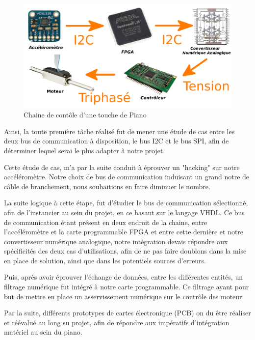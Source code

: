 \documentclass[french,a4paper,12pt]{report}
\begin{document}
	\begin{figure}[!ht]
    \center
  	\includegraphics[width=17cm]{CH.png}
    \caption{Chaine de contôle d'une touche de Piano}
	\end{figure}	
	
	Ainsi, la toute première tâche réalisé fut de mener une étude de cas entre les deux bus de communication à disposition, le bus I2C et le bus SPI, afin de déterminer lequel serai le plus adapter à notre projet.
	
	Cette étude de cas, m'a par la suite conduit à éprouver un "hacking" sur notre accéléromètre. Notre choix de bus de communication induisant un grand notre de câble de branchement, nous souhaitions en faire diminuer le nombre.
	
	La suite logique à cette étape, fut d'étudier le bus de communication sélectionné, afin de l'instancier au sein du projet, en ce basant sur le langage VHDL. Ce bus de communication étant présent en deux endroit de la chaine, entre l'accéléromètre et la carte programmable FPGA et entre cette dernière et notre convertisseur numérique analogique, notre intégration devais répondre aux spécificités des deux cas d'utilisations, afin de ne pas faire doublons dans la mise en place de solution, ainsi que dans les potentiels sources d'erreurs.
	
	Puis, après avoir éprouver l'échange de données, entre les différentes entités, un filtrage numérique fut intégré à notre carte programmable. Ce filtrage ayant pour but de mettre en place un asservissement numérique sur le contrôle des moteur.
	

	Par la suite, différents prototypes de cartes électronique (PCB) on du être réaliser et réévalué au long su projet, afin de répondre aux impératifs d'intégration matériel au sein du piano.
	
\end{document}
